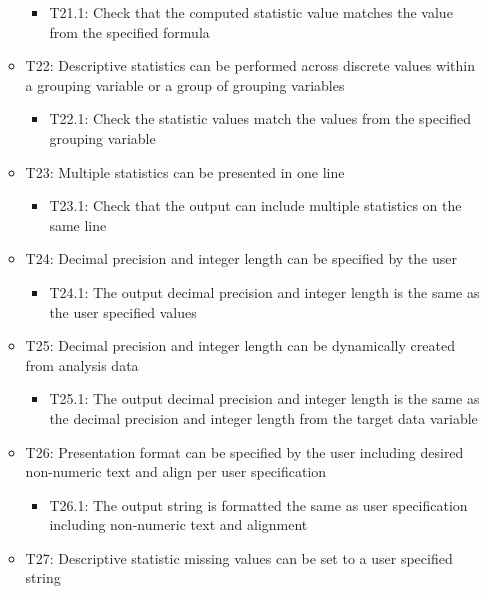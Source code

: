 \documentclass[
]{article}
\providecommand{\tightlist}{%
  \setlength{\itemsep}{0pt}\setlength{\parskip}{0pt}}
\begin{document}
\begin{itemize}
\begin{itemize}
    \begin{itemize}
    \tightlist
    \item
      T21.1: Check that the computed statistic value matches the value
      from the specified formula
    \end{itemize}
  \item
    T22: Descriptive statistics can be performed across discrete values
    within a grouping variable or a group of grouping variables

    \begin{itemize}
    \tightlist
    \item
      T22.1: Check the statistic values match the values from the
      specified grouping variable
    \end{itemize}
  \item
    T23: Multiple statistics can be presented in one line

    \begin{itemize}
    \tightlist
    \item
      T23.1: Check that the output can include multiple statistics on
      the same line
    \end{itemize}
  \item
    T24: Decimal precision and integer length can be specified by the
    user

    \begin{itemize}
    \tightlist
    \item
      T24.1: The output decimal precision and integer length is the same
      as the user specified values
    \end{itemize}
  \item
    T25: Decimal precision and integer length can be dynamically created
    from analysis data

    \begin{itemize}
    \tightlist
    \item
      T25.1: The output decimal precision and integer length is the same
      as the decimal precision and integer length from the target data
      variable
    \end{itemize}
  \item
    T26: Presentation format can be specified by the user including
    desired non-numeric text and align per user specification

    \begin{itemize}
    \tightlist
    \item
      T26.1: The output string is formatted the same as user
      specification including non-numeric text and alignment
    \end{itemize}
  \item
    T27: Descriptive statistic missing values can be set to a user
    specified string


\end{itemize}
\end{itemize}
\end{document}
